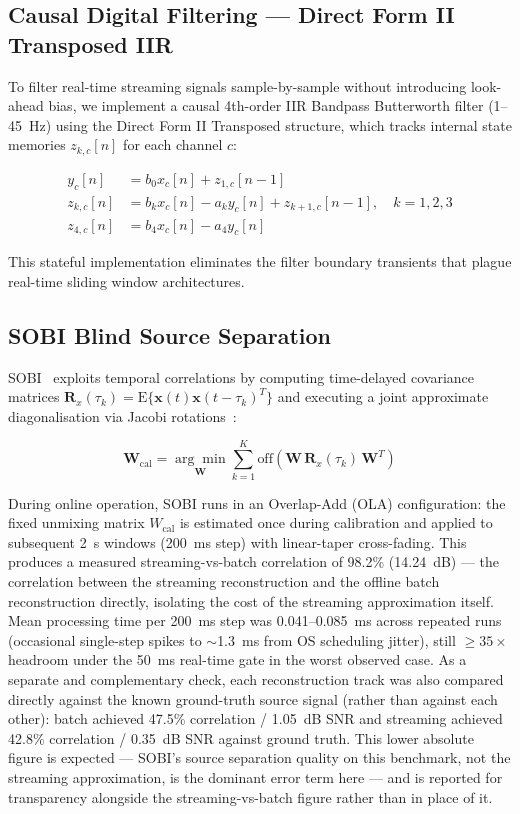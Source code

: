 \documentclass[11pt]{article}
\begin{document}
\subsection{Causal Digital Filtering --- Direct Form II Transposed IIR}

To filter real-time streaming signals sample-by-sample without introducing look-ahead bias, we implement a causal 4th-order IIR Bandpass Butterworth filter (1--45~Hz) using the Direct Form II Transposed structure, which tracks internal state memories $z_{k,c}[n]$ for each channel $c$:

\begin{align}
y_c[n] &= b_0 x_c[n] + z_{1,c}[n-1] \\
z_{k,c}[n] &= b_k x_c[n] - a_k y_c[n] + z_{k+1,c}[n-1], \quad k = 1, 2, 3 \\
z_{4,c}[n] &= b_4 x_c[n] - a_4 y_c[n]
\end{align}

This stateful implementation eliminates the filter boundary transients that plague real-time sliding window architectures.

\subsection{SOBI Blind Source Separation}

SOBI~\cite{belouchrani1997} exploits temporal correlations by computing time-delayed covariance matrices $\mathbf{R}_x(\tau_k) = \mathrm{E}\{\mathbf{x}(t)\mathbf{x}(t-\tau_k)^T\}$ and executing a joint approximate diagonalisation via Jacobi rotations~\cite{cardoso1996}:

\begin{equation}
\mathbf{W}_\text{cal} = \underset{\mathbf{W}}{\arg\min} \sum_{k=1}^{K} \text{off}\!\left(\mathbf{W}\, \mathbf{R}_x(\tau_k)\, \mathbf{W}^T\right)
\end{equation}

During online operation, SOBI runs in an Overlap-Add (OLA) configuration: the fixed unmixing matrix $W_\text{cal}$ is estimated once during calibration and applied to subsequent 2~s windows (200~ms step) with linear-taper cross-fading. This produces a measured streaming-vs-batch correlation of 98.2\% (14.24~dB) --- the correlation between the streaming reconstruction and the offline batch reconstruction directly, isolating the cost of the streaming approximation itself. Mean processing time per 200~ms step was 0.041--0.085~ms across repeated runs (occasional single-step spikes to $\sim$1.3~ms from OS scheduling jitter), still $\geq 35\times$ headroom under the 50~ms real-time gate in the worst observed case. As a separate and complementary check, each reconstruction track was also compared directly against the known ground-truth source signal (rather than against each other): batch achieved 47.5\% correlation / 1.05~dB SNR and streaming achieved 42.8\% correlation / 0.35~dB SNR against ground truth. This lower absolute figure is expected --- SOBI's source separation quality on this benchmark, not the streaming approximation, is the dominant error term here --- and is reported for transparency alongside the streaming-vs-batch figure rather than in place of it.
\end{document}

